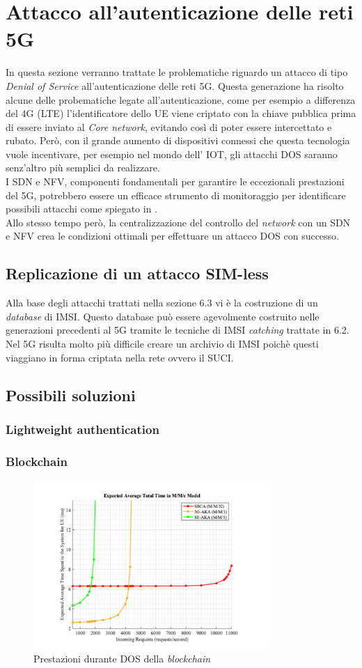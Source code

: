 \section{Attacco all'autenticazione delle reti 5G}
In questa sezione verranno trattate le problematiche riguardo un attacco di tipo \textit{Denial of Service} all'autenticazione delle reti 5G.
Questa generazione ha risolto alcune delle probematiche legate all'autenticazione, come per esempio a differenza del 4G (LTE) l'identificatore 
dello UE viene criptato con la chiave pubblica prima di essere inviato al \textit{Core network}, evitando così di poter essere intercettato e rubato\cite{5g-vs-4g}.
Però, con il grande aumento di dispositivi connessi che questa tecnologia vuole incentivare, per esempio nel mondo dell' IOT, gli attacchi DOS saranno senz'altro più 
semplici da realizzare.\\
I SDN e NFV, componenti fondamentali per garantire le eccezionali prestazioni del 5G, potrebbero essere un efficace strumento di monitoraggio per identificare possibili 
attacchi come spiegato in \cite{dos-detection-with-sdn}.\\
Allo stesso tempo però, la centralizzazione del controllo del \textit{network} con un SDN e NFV crea le condizioni ottimali per effettuare un attacco DOS con successo\cite{5g-dos}.
\subsection{Replicazione di un attacco SIM-less}
Alla base degli attacchi trattati nella sezione 6.3 vi è la costruzione di un \textit{database} di IMSI. Questo database può essere agevolmente costruito nelle generazioni precedenti al 5G 
tramite le tecniche di IMSI \textit{catching} trattate in 6.2. Nel 5G risulta molto più difficile creare un archivio di IMSI poichè questi viaggiano in forma criptata nella rete ovvero il SUCI.

\subsection{Possibili soluzioni}
\subsubsection{Lightweight authentication}
\cite{5g-lightweight}
\subsubsection{Blockchain}
\begin{figure}[ht]
    \centering
    \includegraphics[width=0.8\textwidth]{images/5g-blockchain-dos.png}
    \caption{Prestazioni durante DOS della \textit{blockchain}\cite{5g-blockchain}}
\end{figure}

\cite{5g-imsi-encryption}
